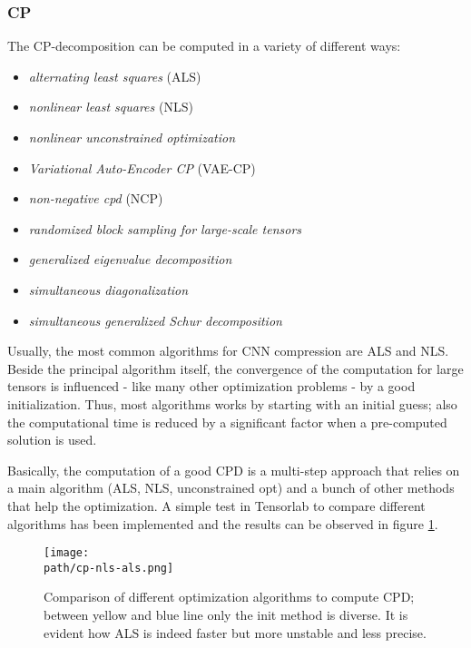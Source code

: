 \subsubsection{CP}
The CP-decomposition can be computed in a variety of different ways: 
    \begin{itemize}
        \item \emph{alternating least squares} (ALS)
        \item \emph{nonlinear least squares} (NLS)
        \item \emph{nonlinear unconstrained optimization}
        \item \emph{Variational Auto-Encoder CP} (VAE-CP)
        \item \emph{non-negative cpd} (NCP)
        \item \emph{randomized block sampling for large-scale tensors}
        \item \emph{generalized eigenvalue decomposition}
        \item \emph{simultaneous diagonalization}
        \item \emph{simultaneous generalized Schur decomposition}
\end{itemize}
Usually, the most common algorithms for CNN compression are ALS and NLS. \\
Beside the principal algorithm itself, the convergence of the computation for large tensors is influenced - like many other optimization problems - by a good initialization. Thus, most algorithms works by starting with an initial guess; also the computational time is reduced by a significant factor when a pre-computed solution is used. 
\newline

Basically, the computation of a good CPD is a multi-step approach that relies on a main algorithm (ALS, NLS, unconstrained opt) and a bunch of other methods that help the optimization. 
A simple test in Tensorlab to compare different algorithms has been implemented and the results can be observed in figure \ref{fig:cp-als-nls}.

\begin{figure}[h!]
 \centering
 \texttt{[image: \\path/cp-nls-als.png]} 
 \caption{Comparison of different optimization algorithms to compute CPD; between yellow and blue line only the init method is diverse. It is evident how ALS is indeed faster but more unstable and less precise.}
 \label{fig:cp-als-nls}
\end{figure} 

